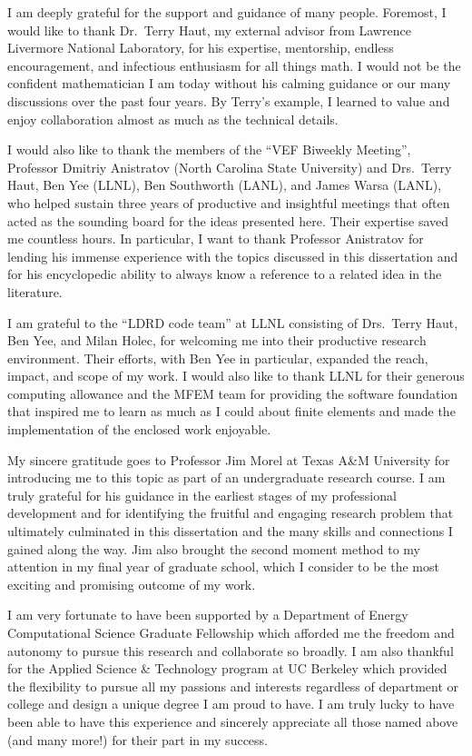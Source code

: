 \documentclass[../doc.tex]{subfiles}
\begin{document}
I am deeply grateful for the support and guidance of many people. 
Foremost, I would like to thank Dr.~Terry Haut, my external advisor from Lawrence Livermore National Laboratory, for his expertise, mentorship, endless encouragement, and infectious enthusiasm for all things math. I would not be the confident mathematician I am today without his calming guidance or our many discussions over the past four years. By Terry's example, I learned to value and enjoy collaboration almost as much as the technical details. 

I would also like to thank the members of the ``VEF Biweekly Meeting'', Professor Dmitriy Anistratov (North Carolina State University) and Drs.~Terry Haut, Ben Yee (LLNL), Ben Southworth (LANL), and James Warsa (LANL), who helped sustain three years of productive and insightful meetings that often acted as the sounding board for the ideas presented here. Their expertise saved me countless hours. In particular, I want to thank Professor Anistratov for lending his immense experience with the topics discussed in this dissertation and for his encyclopedic ability to always know a reference to a related idea in the literature. 

I am grateful to the ``LDRD code team'' at LLNL consisting of Drs.~Terry Haut, Ben Yee, and Milan Holec, for welcoming me into their productive research environment. Their efforts, with Ben Yee in particular, expanded the reach, impact, and scope of my work. I would also like to thank LLNL for their generous computing allowance and the MFEM team for providing the software foundation that inspired me to learn as much as I could about finite elements and made the implementation of the enclosed work enjoyable.  

My sincere gratitude goes to Professor Jim Morel at Texas A\&M University for introducing me to this topic as part of an undergraduate research course. 
I am truly grateful for his guidance in the earliest stages of my professional development and for identifying the fruitful and engaging research problem that ultimately culminated in this dissertation and the many skills and connections I gained along the way. 
Jim also brought the second moment method to my attention in my final year of graduate school, which I consider to be the most exciting and promising outcome of my work. 

I am very fortunate to have been supported by a Department of Energy Computational Science Graduate Fellowship which afforded me the freedom and autonomy to pursue this research and collaborate so broadly. 
I am also thankful for the Applied Science \& Technology program at UC Berkeley which provided the flexibility to pursue all my passions and interests regardless of department or college and design a unique degree I am proud to have. I am truly lucky to have been able to have this experience and sincerely appreciate all those named above (and many more!) for their part in my success. 

\end{document}
